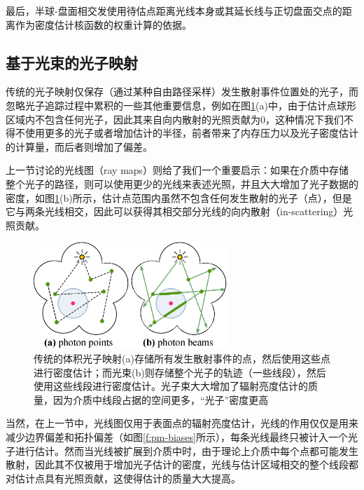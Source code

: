 最后，半球-盘面相交发使用待估点距离光线本身或其延长线与正切盘面交点的距离作为密度估计核函数的权重计算的依据。






\subsection{基于光束的光子映射}
传统的光子映射仅保存（通过某种自由路径采样）发生散射事件位置处的光子，而忽略光子追踪过程中累积的一些其他重要信息，例如在图\ref{f:pm-points-vs-beams}(a)中，由于估计点球形区域内不包含任何光子，因此其来自向内散射的光照贡献为0，这种情况下我们不得不使用更多的光子或者增加估计的半径，前者带来了内存压力以及光子密度估计的计算量，而后者则增加了偏差。

上一节讨论的光线图（ray maps）则给了我们一个重要启示：如果在介质中存储整个光子的路径，则可以使用更少的光线来表述光照，并且大大增加了光子数据的密度，如图\ref{f:pm-points-vs-beams}(b)所示，估计点范围内虽然不包含任何发生散射的光子（点），但是它与两条光线相交，因此可以获得其相交部分光线的向内散射（in-scattering）光照贡献。

\begin{figure}
	\sidecaption
	\includegraphics[width=0.65\textwidth]{figures/pm/points-vs-beams}
	\caption{传统的体积光子映射(a)存储所有发生散射事件的点，然后使用这些点进行密度估计；而光束(b)则存储整个光子的轨迹（一些线段），然后使用这些线段进行密度估计。光子束大大增加了辐射亮度估计的质量，因为介质中线段占据的空间更多，“光子”密度更高}
	\label{f:pm-points-vs-beams}
\end{figure}

当然，在上一节中，光线图仅用于表面点的辐射亮度估计，光线的作用仅仅是用来减少边界偏差和拓扑偏差（如图\ref{f:pm-biases}所示），每条光线最终只被计入一个光子进行估计。然而当光线被扩展到介质中时，由于理论上介质中每个点都可能发生散射，因此其不仅被用于增加光子估计的密度，光线与估计区域相交的整个线段都对估计点具有光照贡献，这使得估计的质量大大提高。

